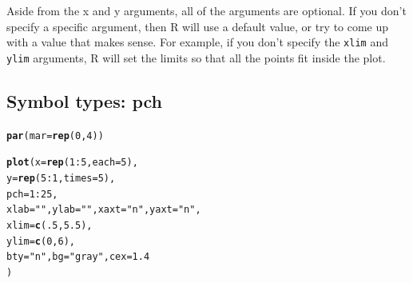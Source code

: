\documentclass{tufte-book}\usepackage[]{graphicx}\usepackage[]{color}
\makeatletter
\newcommand{\hlnum}[1]{\textcolor[rgb]{0.686,0.059,0.569}{#1}}%
\newcommand{\hlstr}[1]{\textcolor[rgb]{0.192,0.494,0.8}{#1}}%
\newcommand{\hlopt}[1]{\textcolor[rgb]{0,0,0}{#1}}%
\newcommand{\hlstd}[1]{\textcolor[rgb]{0.345,0.345,0.345}{#1}}%
\newcommand{\hlkwc}[1]{\textcolor[rgb]{0.333,0.667,0.333}{#1}}%
\newcommand{\hlkwd}[1]{\textcolor[rgb]{0.737,0.353,0.396}{\textbf{#1}}}%
\newenvironment{kframe}{%
 \def\at@end@of@kframe{}%
 \ifinner\ifhmode%
  \def\at@end@of@kframe{\end{minipage}}%
  \begin{minipage}{\columnwidth}%
 \fi\fi%
 \def\FrameCommand##1{\hskip\@totalleftmargin \hskip-\fboxsep
 \colorbox{shadecolor}{##1}\hskip-\fboxsep
     \hskip-\linewidth \hskip-\@totalleftmargin \hskip\columnwidth}%
 \MakeFramed {\advance\hsize-\width
   \@totalleftmargin\z@ \linewidth\hsize
   \@setminipage}}%
 {\par\unskip\endMakeFramed%
 \at@end@of@kframe}
\newenvironment{knitrout}{}{} %
\makeatother
\begin{document}
Aside from the x and y arguments, all of the arguments are optional. If you don't specify a specific argument, then R will use a default value, or try to come up with a value that makes sense. For example, if you don't specify the \texttt{xlim} and \texttt{ylim} arguments, R will set the limits so that all the points fit inside the plot.

\subsection{Symbol types: pch}


\begin{marginfigure}
\begin{tiny}
\begin{knitrout}
\color{fgcolor}\begin{kframe}
\begin{alltt}
\hlkwd{par}\hlstd{(}\hlkwc{mar}  \hlstd{=} \hlkwd{rep}\hlstd{(}\hlnum{0}\hlstd{,} \hlnum{4}\hlstd{))}

\hlkwd{plot}\hlstd{(}\hlkwc{x} \hlstd{=} \hlkwd{rep}\hlstd{(}\hlnum{1}\hlopt{:}\hlnum{5}\hlstd{,} \hlkwc{each} \hlstd{=} \hlnum{5}\hlstd{),}
     \hlkwc{y} \hlstd{=} \hlkwd{rep}\hlstd{(}\hlnum{5}\hlopt{:}\hlnum{1}\hlstd{,} \hlkwc{times} \hlstd{=} \hlnum{5}\hlstd{),}
     \hlkwc{pch} \hlstd{=} \hlnum{1}\hlopt{:}\hlnum{25}\hlstd{,}
     \hlkwc{xlab} \hlstd{=} \hlstr{""}\hlstd{,} \hlkwc{ylab} \hlstd{=} \hlstr{""}\hlstd{,} \hlkwc{xaxt} \hlstd{=} \hlstr{"n"}\hlstd{,} \hlkwc{yaxt} \hlstd{=} \hlstr{"n"}\hlstd{,}
     \hlkwc{xlim} \hlstd{=} \hlkwd{c}\hlstd{(}\hlnum{.5}\hlstd{,} \hlnum{5.5}\hlstd{),}
     \hlkwc{ylim} \hlstd{=} \hlkwd{c}\hlstd{(}\hlnum{0}\hlstd{,} \hlnum{6}\hlstd{),}
     \hlkwc{bty} \hlstd{=} \hlstr{"n"}\hlstd{,} \hlkwc{bg} \hlstd{=} \hlstr{"gray"}\hlstd{,} \hlkwc{cex} \hlstd{=} \hlnum{1.4}
     \hlstd{)}


\end{alltt}
\end{kframe}
\end{knitrout}
\end{tiny}
\end{marginfigure}
\end{document}
